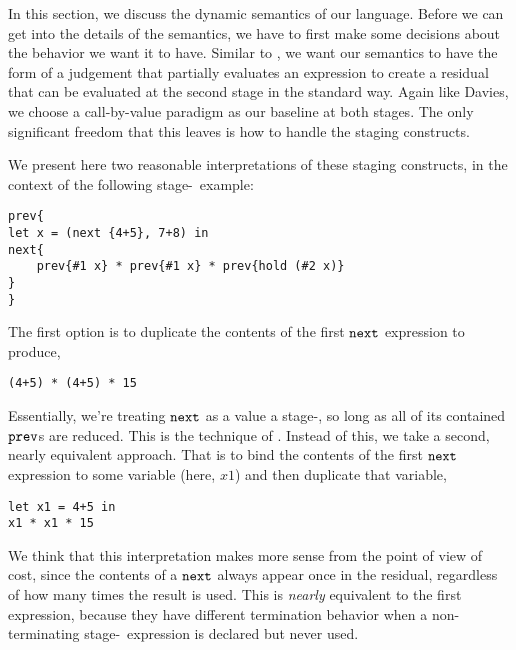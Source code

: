 In this section, we discuss the dynamic semantics of our language.  
Before we can get into the details of the semantics, we have to first make some decisions about the behavior we want it to have.  
Similar to \cite{davies96}, we want our semantics to have the form of a judgement that partially evaluates an expression to create a residual that can be evaluated at the second stage in the standard way.  Again like Davies, we choose a call-by-value paradigm as our baseline at both stages.  The only significant freedom that this leaves is how to handle the staging constructs.  

We present here two reasonable interpretations of these staging constructs, 
in the context of the following stage-\bbtwo~example:
\begin{lstlisting} 
prev{
let x = (next {4+5}, 7+8) in
next{
	prev{#1 x} * prev{#1 x} * prev{hold (#2 x)}
}
}
\end{lstlisting}
The first option is to duplicate the contents of the first ${\tt next}$ expression to produce,
\begin{lstlisting}
(4+5) * (4+5) * 15
\end{lstlisting}
Essentially, we're treating ${\tt next}$ as a value a stage-\bbone, so long as all of its contained ${\tt prev}$s are reduced.  
This is the technique of \cite{davies96}.
Instead of this, we take a second, nearly equivalent approach.  
That is to bind the contents of the first ${\tt next}$ expression to some variable (here, $x1$) and then duplicate that variable,
\begin{lstlisting} 
let x1 = 4+5 in
x1 * x1 * 15
\end{lstlisting}

We think that this interpretation makes more sense from the point of view of cost, 
since the contents of a ${\tt next}$ always appear once in the residual, regardless of how many times the result is used.  
This is {\em nearly} equivalent to the first expression, because they have different termination behavior 
when a non-terminating stage-\bbtwo~expression is declared but never used.

